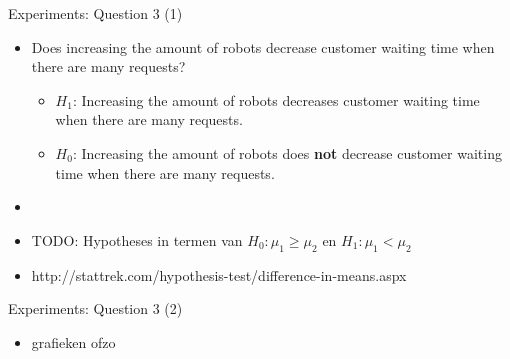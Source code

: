 \begin{frame}{Experiments: Question 3 (1)}
    \begin{itemize}
        \item Does increasing the amount of robots decrease customer waiting time when there are many requests?
        \begin{itemize}
                \item $H_1$: Increasing the amount of robots decreases customer waiting time when there are many requests.
                \item $H_0$: Increasing the amount of robots does \textbf{not} decrease customer waiting time when there are many requests.
        \end{itemize}

        \item[]
        \item TODO: Hypotheses in termen van $H_0: \mu_1 \geq \mu_2$ en $H_1: \mu_1 < \mu_2$
        \item http://stattrek.com/hypothesis-test/difference-in-means.aspx
    \end{itemize}
\end{frame}



\begin{frame}{Experiments: Question 3 (2)}
    \begin{itemize}
        \item grafieken ofzo
    \end{itemize}
\end{frame}


